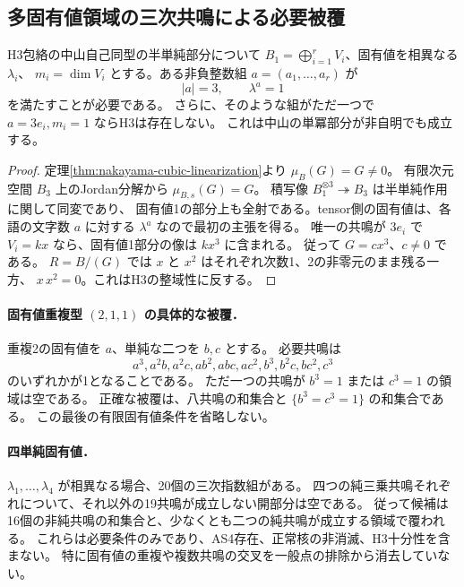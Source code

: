 \subsection{多固有値領域の三次共鳴による必要被覆}
\label{subsec:cubic-spectral-resonance}
\begin{proposition}[単純固有直線の孤立純三乗共鳴の排除]
\label{prop:cubic-spectral-resonance}
H3包絡の中山自己同型の半単純部分について
$B_1=\bigoplus_{i=1}^r V_i$、固有値を相異なる $\lambda_i$、
$m_i=\dim V_i$ とする。ある非負整数組 $a=(a_1,\ldots,a_r)$ が
\[
 |a|=3,\qquad \lambda^a=1
\]
を満たすことが必要である。
さらに、そのような組がただ一つで $a=3e_i,m_i=1$ ならH3は存在しない。
これは中山の単冪部分が非自明でも成立する。
\end{proposition}
\begin{proof}
定理\ref{thm:nakayama-cubic-linearization}より $\mu_B(G)=G\ne0$。
有限次元空間 $B_3$ 上のJordan分解から $\mu_{B,s}(G)=G$。
積写像 $B_1^{\otimes3}\twoheadrightarrow B_3$ は半単純作用に関して同変であり、
固有値1の部分上も全射である。tensor側の固有値は、各語の文字数 $a$ に対する
$\lambda^a$ なので最初の主張を得る。
唯一の共鳴が $3e_i$ で $V_i=kx$ なら、固有値1部分の像は $kx^3$ に含まれる。
従って $G=cx^3$、$c\ne0$ である。
$R=B/(G)$ では $x$ と $x^2$ はそれぞれ次数1、2の非零元のまま残る一方、
$x\,x^2=0$。これはH3の整域性に反する。
\end{proof}

\paragraph{固有値重複型 $(2,1,1)$ の具体的な被覆．}
重複2の固有値を $a$、単純な二つを $b,c$ とする。
必要共鳴は
\[
 a^3,a^2b,a^2c,ab^2,abc,ac^2,b^3,b^2c,bc^2,c^3
\]
のいずれかが1となることである。
ただ一つの共鳴が $b^3=1$ または $c^3=1$ の領域は空である。
正確な被覆は、八共鳴の和集合と $\{b^3=c^3=1\}$ の和集合である。
この最後の有限固有値条件を省略しない。

\paragraph{四単純固有値．}
$\lambda_1,\ldots,\lambda_4$ が相異なる場合、20個の三次指数組がある。
四つの純三乗共鳴それぞれについて、それ以外の19共鳴が成立しない開部分は空である。
従って候補は16個の非純共鳴の和集合と、少なくとも二つの純共鳴が成立する領域で覆われる。
これらは必要条件のみであり、AS4存在、正常核の非消滅、H3十分性を含まない。
特に固有値の重複や複数共鳴の交叉を一般点の排除から消去していない。

